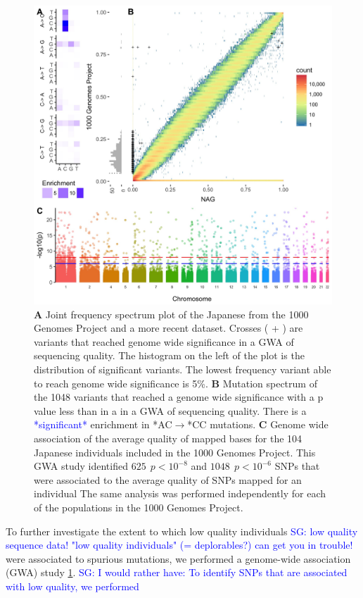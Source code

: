 \documentclass[9pt,lineno]{elife}
\newcommand{\sgcomment}[1]{\textcolor{blue}{SG: #1}}
\newcommand{\todo}[1]{\textcolor{blue}{*#1*}}
\begin{document}
\begin{figure}
\includegraphics[width=\hsize,keepaspectratio]{Figure1.jpg}
\caption{
\textbf{A} 
Joint frequency spectrum plot of the Japanese from the 1000 Genomes Project and a more recent dataset.
Crosses ( + ) are variants that reached genome wide significance in a GWA of sequencing quality. 
The histogram on the left of the plot is the distribution of significant variants. 
The lowest frequency variant able to reach genome wide significance is 5\%.
\textbf{B} 
Mutation spectrum of the 1048 variants that reached a genome wide significance with a p value less than  in a in a GWA of sequencing quality. 
There is a \todo{significant} enrichment in *AC${\rightarrow}$*CC mutations. 
\textbf{C} 
Genome wide association of the average quality of mapped bases for the 104 Japanese individuals included in the 1000 Genomes Project. This GWA study identified $625\ \  p < 10^{-8}$ and $1048\ \ p < 10^{-6}$ SNPs that were associated to the average quality of SNPs mapped for an individual
The same analysis was performed independently for each of the populations in the 1000 Genomes Project. }
 \label{Figure1}
\end{figure}

To further investigate	 the extent to which low quality individuals \sgcomment{low quality sequence data! "low quality individuals" (= deplorables?) can get you in trouble!}  were associated to spurious mutations, we performed a genome-wide association (GWA) study  \ref{Figure1}. \sgcomment{I would rather have: To identify SNPs that are associated with low quality, we performed }
\end{document}
